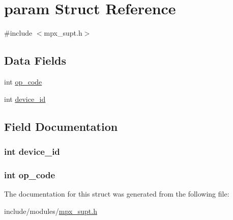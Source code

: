 \hypertarget{structparam}{}\section{param Struct Reference}
\label{structparam}


{\ttfamily \#include $<$mpx\+\_\+supt.\+h$>$}

\subsection*{Data Fields}
\begin{DoxyCompactItemize}
\item 
int \hyperlink{structparam_ab3dee384d0abe30d9ff31e204430241d}{op\+\_\+code}
\item 
int \hyperlink{structparam_accfd0301c469314772cc651ec198d492}{device\+\_\+id}
\end{DoxyCompactItemize}


\subsection{Field Documentation}
\subsubsection[{\texorpdfstring{device\+\_\+id}{device_id}}]{\setlength{\rightskip}{0pt plus 5cm}int device\+\_\+id}\hypertarget{structparam_accfd0301c469314772cc651ec198d492}{}\label{structparam_accfd0301c469314772cc651ec198d492}
\subsubsection[{\texorpdfstring{op\+\_\+code}{op_code}}]{\setlength{\rightskip}{0pt plus 5cm}int op\+\_\+code}\hypertarget{structparam_ab3dee384d0abe30d9ff31e204430241d}{}\label{structparam_ab3dee384d0abe30d9ff31e204430241d}


The documentation for this struct was generated from the following file\+:\begin{DoxyCompactItemize}
\item 
include/modules/\hyperlink{mpx__supt_8h}{mpx\+\_\+supt.\+h}\end{DoxyCompactItemize}

